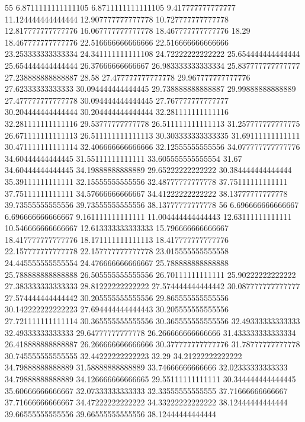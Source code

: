 55 6.8711111111111105 6.8711111111111105 9.417777777777777 11.124444444444444 12.907777777777778 10.727777777777778 12.817777777777776 16.067777777777778 18.467777777777776 18.29 18.467777777777776 22.516666666666666 22.516666666666666 23.253333333333334 24.341111111111108 24.72222222222222 25.654444444444444 25.654444444444444 26.37666666666667 26.983333333333334 25.837777777777777 27.238888888888887 28.58 27.477777777777778 29.967777777777776 27.62333333333333 30.094444444444445 29.738888888888887 29.99888888888889 27.477777777777778 30.094444444444445 27.767777777777777 30.204444444444444 30.204444444444444 32.281111111111116 32.281111111111116 29.53777777777778 26.511111111111113 31.257777777777775 26.671111111111113 26.511111111111113 30.303333333333335 31.69111111111111 30.471111111111114 32.406666666666666 32.12555555555556 34.077777777777776 34.60444444444445 31.55111111111111 33.605555555555554 31.67 34.60444444444445 34.19888888888889 29.65222222222222 30.384444444444444 35.39111111111111 32.15555555555556 32.48777777777778 37.75111111111111 37.75111111111111 34.57666666666667 34.41222222222222 38.13777777777778 39.73555555555556 39.73555555555556 38.13777777777778
56 6.696666666666667 6.696666666666667 9.161111111111111 11.004444444444443 12.63111111111111 10.546666666666667 12.613333333333333 15.796666666666667 18.417777777777776 18.171111111111113 18.417777777777776 22.157777777777778 22.157777777777778 23.015555555555558 24.445555555555554 24.476666666666667 25.788888888888888 25.788888888888888 26.505555555555556 26.70111111111111 25.90222222222222 27.383333333333333 28.81222222222222 27.574444444444442 30.087777777777777 27.574444444444442 30.205555555555556 29.865555555555556 30.142222222222223 27.694444444444443 30.205555555555556 27.721111111111114 30.365555555555556 30.365555555555556 32.49333333333333 32.49333333333333 29.64777777777778 26.266666666666666 31.433333333333334 26.418888888888887 26.266666666666666 30.377777777777776 31.78777777777778 30.745555555555555 32.44222222222223 32.29 34.21222222222222 34.79888888888889 31.58888888888889 33.74666666666666 32.02333333333333 34.79888888888889 34.126666666666665 29.55111111111111 30.344444444444445 35.60666666666667 32.07333333333333 32.33555555555555 37.71666666666667 37.71666666666667 34.47222222222222 34.33222222222222 38.12444444444444 39.66555555555556 39.66555555555556 38.12444444444444
